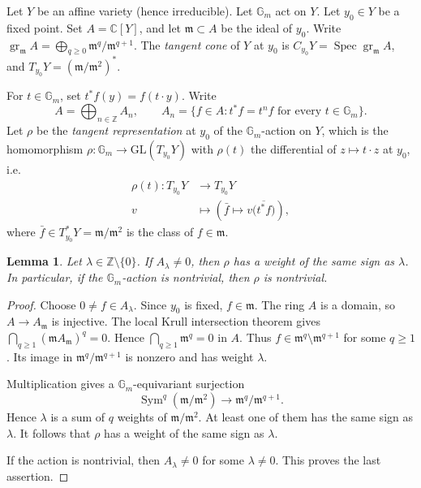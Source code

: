 \documentclass[12pt]{article}
\newtheorem{lemma}[theorem]{Lemma}
\theoremstyle{definition}
\DeclareMathOperator{\Spec}{Spec}
\DeclareMathOperator{\Sym}{Sym}
\DeclareMathOperator{\gr}{gr}
\newcommand{\C}{\mathbb C}
\newcommand{\Gm}{\mathbb G_m}
\newcommand{\GL}{\mathrm{GL}}
\begin{document}
Let $Y$ be an affine variety (hence irreducible). Let $\Gm$ act on $Y$. Let $y_0\in Y$ be a fixed point. Set $A=\C[Y]$, and let $\mathfrak m\subset A$ be the ideal of $y_0$. Write $\gr_{\mathfrak m}A=\bigoplus_{q\ge0}\mathfrak m^q/\mathfrak m^{q+1}$. The \emph{tangent cone} of $Y$ at $y_0$ is $C_{y_0}Y=\Spec\gr_{\mathfrak m}A$, and $T_{y_0}Y=(\mathfrak m/\mathfrak m^2)^*$.

For $t\in\Gm$, set $t^*f(y)=f(t\cdot y)$. Write
\[
    A=\bigoplus_{n\in\mathbb Z}A_n,
    \qquad
    A_n=\{f\in A:t^*f=t^nf\text{ for every }t\in\Gm\}.
\]
Let $\rho$ be the \emph{tangent representation} at $y_0$ of the $\Gm$-action on $Y$, which is the homomorphism
$\rho:\Gm \longrightarrow \GL(T_{y_0}Y)$ with $\rho(t)$ the differential of $z\mapsto t\cdot z$ at $y_0$, i.e.
    \[
        \begin{aligned}
            \rho(t):T_{y_0}Y& \longrightarrow T_{y_0}Y\\
            v &\longmapsto
            \left(\bar f\mapsto v\bigl(\overline{t^*f}\bigr)\right),
        \end{aligned}
    \]
    where $\bar f\in T_{y_0}^*Y=\mathfrak m/\mathfrak m^2$ is the class of $f\in\mathfrak m$. 



\begin{lemma}\label{weightsigns}
    Let $\lambda\in\mathbb Z\setminus\{0\}$. If $A_\lambda\ne0$, then $\rho$ has a weight of the same sign as $\lambda$. In particular, if the $\Gm$-action is nontrivial, then $\rho$ is nontrivial.
\end{lemma}
\begin{proof}
    Choose $0\ne f\in A_\lambda$. Since $y_0$ is fixed, $f\in\mathfrak m$.
    The ring $A$ is a domain, so $A\to A_{\mathfrak m}$ is injective. The local Krull intersection theorem gives $\bigcap_{q\ge1}(\mathfrak mA_{\mathfrak m})^q=0$.
    Hence $\bigcap_{q\ge1}\mathfrak m^q=0$ in $A$. Thus $f\in\mathfrak m^q\setminus\mathfrak m^{q+1}$ for some $q\ge1$. Its image in $\mathfrak m^q/\mathfrak m^{q+1}$ is nonzero and has weight $\lambda$.

    Multiplication gives a $\Gm$-equivariant surjection
    \[
        \Sym^q(\mathfrak m/\mathfrak m^2)
        \longrightarrow
        \mathfrak m^q/\mathfrak m^{q+1}.
    \]
    Hence $\lambda$ is a sum of $q$ weights of $\mathfrak m/\mathfrak m^2$. At least one of them has the same sign as $\lambda$. It follows that $\rho$ has a weight of the same sign as $\lambda$.

    If the action is nontrivial, then $A_\lambda\ne0$ for some $\lambda\ne0$. This proves the last assertion.
\end{proof}
\end{document}
